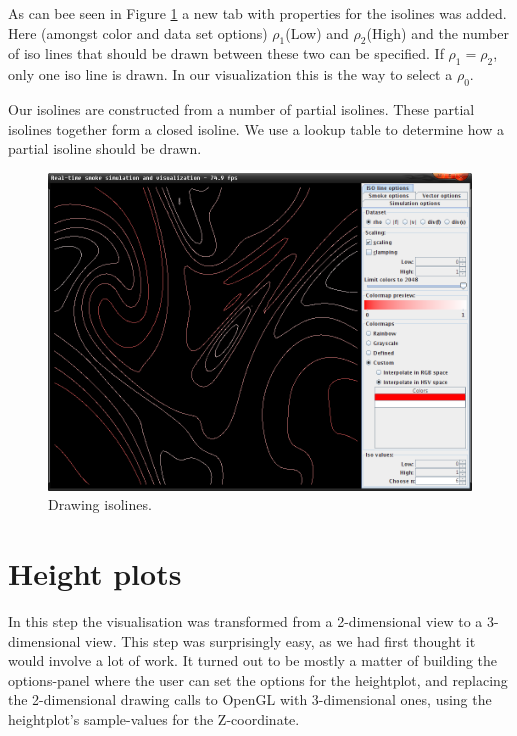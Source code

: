 \documentclass[a4paper,11pt,twoside]{report}
\begin{document}
        As can bee seen in Figure \ref{fig:step5} a new tab with properties for the isolines was added. Here (amongst color and data set options) $\rho_1$(Low) and $\rho_2$(High) and the number of iso lines that should be drawn between these two can be specified. If $\rho_1 = \rho_2$, only one iso line is drawn. In our visualization this is the way to select a $\rho_0$.

        Our isolines are constructed from a number of partial isolines. These partial isolines together form a closed isoline. We use a lookup table to determine how a partial isoline should be drawn.
		\begin{figure}[h]
		\centering
		\includegraphics[scale=\imagescalefactor]{images/step5.png}
		\caption{Drawing isolines.}\label{fig:step5}
		\end{figure}
		\clearpage
	\section{Height plots}
		In this step the visualisation was transformed from a 2-dimensional view to a 3-dimensional view. This step was surprisingly easy, as we had first thought it would involve a lot of work. It turned out to be mostly a matter of building the options-panel where the user can set the options for the heightplot, and replacing the 2-dimensional drawing calls to OpenGL with 3-dimensional ones, using the heightplot's sample-values for the Z-coordinate.
\end{document}
